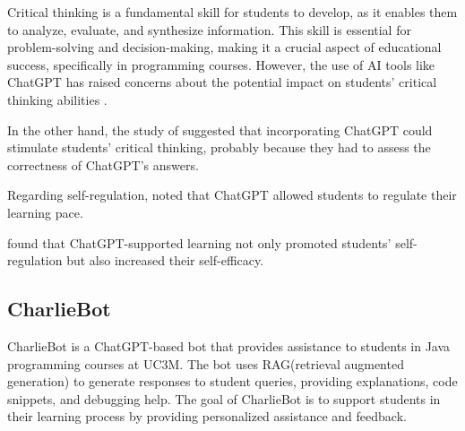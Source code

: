 \documentclass[conference]{IEEEtran}
\begin{document}
Critical thinking is a fundamental skill for students to develop, as it enables
them to analyze, evaluate, and synthesize information. This skill is essential
for problem-solving and decision-making, making it a crucial aspect of
educational success, specifically in programming courses. However, the use of AI
tools like ChatGPT has raised concerns about the potential impact on students'
critical thinking abilities \cite{Vargas2023} \cite{cai23} \cite{chan23}.


In the other hand, the study of \cite{zhang24} suggested that incorporating
ChatGPT could stimulate students' critical thinking, probably because they
had to assess the correctness of ChatGPT's answers.

Regarding self-regulation, \cite{cai23} noted that ChatGPT allowed students to
regulate their learning pace.

\cite{wu24} found that ChatGPT-supported learning not only promoted students'
self-regulation but also increased their self-efficacy.


\subsection{CharlieBot}

CharlieBot is a ChatGPT-based bot that provides assistance to students in Java
programming courses at UC3M. The bot uses RAG(retrieval augmented generation) to
generate responses to student queries, providing explanations, code snippets,
and debugging help. The goal of CharlieBot is to support students in their
learning process by providing personalized assistance and feedback.
\end{document}
